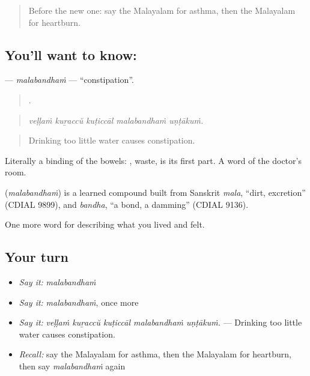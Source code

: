 \label{lesson:ML-C534-malabandham}



\begin{quote}
Before the new one: say the Malayalam for asthma, then the Malayalam for heartburn.
\end{quote}

\subsection*{You'll want to know: }
\textbf{} — \emph{malabandhaṁ} — \textquotedblleft{}constipation\textquotedblright{}.

\begin{quote}
    .
\end{quote}

\begin{quote}
\emph{veḷḷaṁ kuṟaccŭ kuṭiccāl malabandhaṁ uṇṭākuṁ.}
\end{quote}

\begin{quote}
Drinking too little water causes constipation.
\end{quote}

Literally a binding of the bowels: , waste, is its first part. A word of the doctor's room.

\begin{cousinweb}
\textbf{} (\emph{malabandhaṁ}) is a learned compound built from Sanskrit \emph{mala}, \textquotedblleft{}dirt, excretion\textquotedblright{} (CDIAL 9899), and \emph{bandha}, \textquotedblleft{}a bond, a damming\textquotedblright{} (CDIAL 9136).
\end{cousinweb}

\begin{grammarlens}[title={What you've built}]
One more word for describing what you lived and felt.
\end{grammarlens}

\subsection*{Your turn}
\begin{itemize}
\raggedright
  \item \emph{Say it:} \emph{malabandhaṁ}
  \item \emph{Say it:} \emph{malabandhaṁ}, once more
  \item \emph{Say it:} \emph{veḷḷaṁ kuṟaccŭ kuṭiccāl malabandhaṁ uṇṭākuṁ.} — Drinking too little water causes constipation.
  \item \emph{Recall:} say the Malayalam for asthma, then the Malayalam for heartburn, then say \emph{malabandhaṁ} again
\end{itemize}

